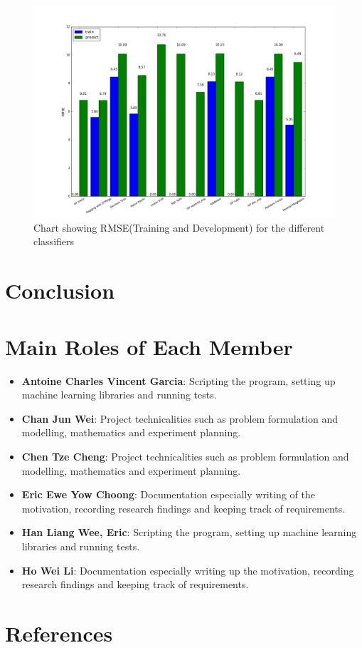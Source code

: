 \documentclass{article}
\begin{document}
 \begin{figure}
  \includegraphics[width=\textwidth]{results}
  \caption{Chart showing RMSE(Training and Development) for the different classifiers}
  \label{rmse_results_chart}
 \end{figure}
	\section{Conclusion}	


	\section{Main Roles of Each Member}
	\begin{itemize}
		\item \textbf{Antoine Charles Vincent Garcia}: 
		Scripting the program, setting up machine learning libraries and running tests.
		\item \textbf{Chan Jun Wei}: 
		Project technicalities such as problem formulation and modelling, mathematics and experiment planning.
		\item \textbf{Chen Tze Cheng}: 
		Project technicalities such as problem formulation and modelling, mathematics and experiment planning.
		\item \textbf{Eric Ewe Yow Choong}: 
		Documentation especially writing of the motivation, recording research findings and keeping track of requirements.
		\item \textbf{Han Liang Wee, Eric}: 
		Scripting the program, setting up machine learning libraries and running tests.
		\item \textbf{Ho Wei Li}: 
		Documentation especially writing up the motivation, recording research findings and keeping track of requirements.
	\end{itemize}
	
	\section{References}
\end{document}
